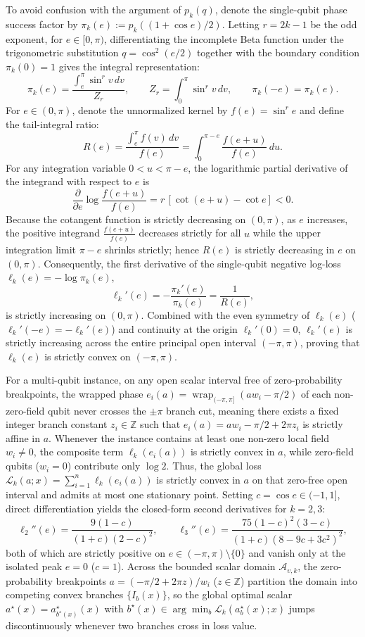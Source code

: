 \documentclass{article}
\theoremstyle{plain}
\theoremstyle{definition}
\begin{document}
To avoid confusion with the argument of $p_k(q)$, denote the single-qubit phase success factor by $\pi_k(e):=p_k((1+\cos e)/2)$. Letting $r=2k-1$ be the odd exponent, for $e\in[0,\pi)$, differentiating the incomplete Beta function under the trigonometric substitution $q=\cos^2(e/2)$ together with the boundary condition $\pi_k(0)=1$ gives the integral representation:
\[
\pi_k(e)=\frac{\int_e^\pi\sin^r v\,dv}{Z_r},
\qquad Z_r=\int_0^\pi\sin^r v\,dv,
\qquad \pi_k(-e)=\pi_k(e).
\]
For $e\in(0,\pi)$, denote the unnormalized kernel by $f(e)=\sin^r e$ and define the tail-integral ratio:
\[
R(e)=\frac{\int_e^\pi f(v)\,dv}{f(e)}
=\int_0^{\pi-e}\frac{f(e+u)}{f(e)}\,du.
\]
For any integration variable $0<u<\pi-e$, the logarithmic partial derivative of the integrand with respect to $e$ is
\[
\frac{\partial}{\partial e}
\log\frac{f(e+u)}{f(e)}
=r\,[\cot(e+u)-\cot e]<0.
\]
Because the cotangent function is strictly decreasing on $(0,\pi)$, as $e$ increases, the positive integrand $\frac{f(e+u)}{f(e)}$ decreases strictly for all $u$ while the upper integration limit $\pi-e$ shrinks strictly; hence $R(e)$ is strictly decreasing in $e$ on $(0,\pi)$. Consequently, the first derivative of the single-qubit negative log-loss $\ell_k(e)=-\log\pi_k(e)$,
\[
\ell_k'(e)=-\frac{\pi_k'(e)}{\pi_k(e)}
=\frac1{R(e)},
\]
is strictly increasing on $(0,\pi)$. Combined with the even symmetry of $\ell_k(e)$ ($\ell_k'(-e)=-\ell_k'(e)$) and continuity at the origin $\ell_k'(0)=0$, $\ell_k'(e)$ is strictly increasing across the entire principal open interval $(-\pi,\pi)$, proving that $\ell_k(e)$ is strictly convex on $(-\pi,\pi)$.

For a multi-qubit instance, on any open scalar interval free of zero-probability breakpoints, the wrapped phase $e_i(a)=\operatorname{wrap}_{(-\pi,\pi]}(aw_i-\pi/2)$ of each non-zero-field qubit never crosses the $\pm\pi$ branch cut, meaning there exists a fixed integer branch constant $z_i\in\mathbb Z$ such that $e_i(a)=aw_i-\pi/2+2\pi z_i$ is strictly affine in $a$. Whenever the instance contains at least one non-zero local field $w_i\ne 0$, the composite term $\ell_k(e_i(a))$ is strictly convex in $a$, while zero-field qubits ($w_i=0$) contribute only $\log 2$. Thus, the global loss $\mathcal L_k(a;x)=\sum_{i=1}^n\ell_k(e_i(a))$ is strictly convex in $a$ on that zero-free open interval and admits at most one stationary point. Setting $c=\cos e\in(-1,1]$, direct differentiation yields the closed-form second derivatives for $k=2,3$:
\[
\ell_2''(e)=\frac{9(1-c)}{(1+c)(2-c)^2},\qquad
\ell_3''(e)=\frac{75(1-c)^2(3-c)}{(1+c)(8-9c+3c^2)^2},
\]
both of which are strictly positive on $e\in(-\pi,\pi)\setminus\{0\}$ and vanish only at the isolated peak $e=0$ ($c=1$). Across the bounded scalar domain $\mathcal A_{v,k}$, the zero-probability breakpoints $a=(-\pi/2+2\pi z)/w_i$ ($z\in\mathbb Z$) partition the domain into competing convex branches $\{I_b(x)\}$, so the global optimal scalar $a^\star(x)=a_{b^\star(x)}^\star(x)$ with $b^\star(x)\in\arg\min_b\mathcal L_k(a_b^\star(x);x)$ jumps discontinuously whenever two branches cross in loss value.
\end{document}
